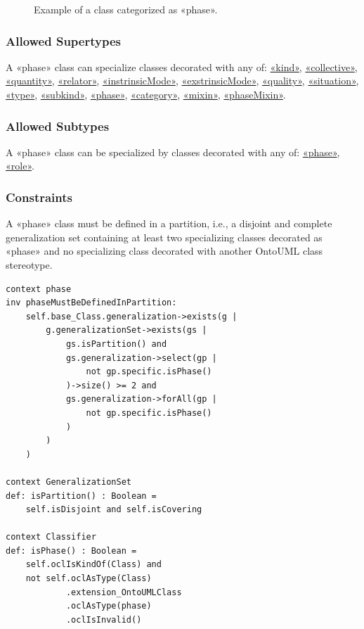 \begin{figure}[h]
    \centering
    
    \caption{Example of a class categorized as «phase».}
    \label{fig:phase-example}
\end{figure}

\subsubsection{Allowed Supertypes}

A «phase» class can specialize classes decorated with any of: 
\hyperref[stereotype:kind]{«kind»}, \hyperref[stereotype:collective]{«collective»}, \hyperref[stereotype:quantity]{«quantity»}, \hyperref[stereotype:relator]{«relator»}, \hyperref[stereotype:intrinsicMode]{«instrinsicMode»},
\hyperref[stereotype:extrinsicMode]{«exstrinsicMode»}, \hyperref[stereotype:quality]{«quality»}, \hyperref[stereotype:situation]{«situation»}, \hyperref[stereotype:type]{«type»}, \hyperref[stereotype:subkind]{«subkind»}, \hyperref[stereotype:phase]{«phase»}, \hyperref[stereotype:category]{«category»}, \hyperref[stereotype:mixin]{«mixin»}, \hyperref[stereotype:phaseMixin]{«phaseMixin»}.

\subsubsection{Allowed Subtypes}

A «phase» class can be specialized by classes decorated with any of: 
\hyperref[stereotype:phase]{«phase»}, \hyperref[stereotype:role]{«role»}.

\subsubsection{Constraints}

\begin{constraint}
\label{phaseMustBeDefinedInPartition}    
A «phase» class must be defined in a partition, i.e., a disjoint and complete generalization set containing at least two specializing classes decorated as «phase» and no specializing class decorated with another OntoUML class stereotype.

\begin{lstlisting}[language=OCL]
context phase
inv phaseMustBeDefinedInPartition:
    self.base_Class.generalization->exists(g |
        g.generalizationSet->exists(gs |
            gs.isPartition() and
            gs.generalization->select(gp |
                not gp.specific.isPhase()
            )->size() >= 2 and
            gs.generalization->forAll(gp |
                not gp.specific.isPhase()
            )
        )
    )

context GeneralizationSet
def: isPartition() : Boolean =
    self.isDisjoint and self.isCovering

context Classifier
def: isPhase() : Boolean =
    self.oclIsKindOf(Class) and
    not self.oclAsType(Class)
            .extension_OntoUMLClass
            .oclAsType(phase)
            .oclIsInvalid()

\end{lstlisting}
\end{constraint}

